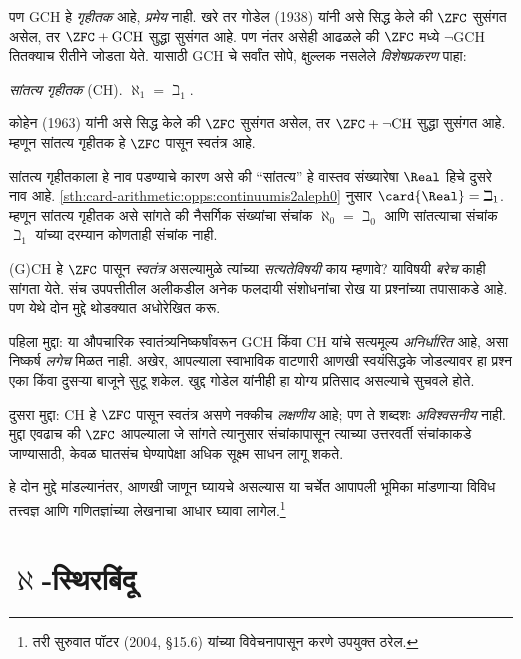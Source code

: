 पण GCH हे \emph{गृहीतक} आहे, \emph{प्रमेय} नाही. खरे तर गोडेल (1938) यांनी असे सिद्ध केले की $\ZFC$ सुसंगत असेल, तर $\ZFC + \text{GCH}$ सुद्धा सुसंगत आहे. पण नंतर असेही आढळले की $\ZFC$ मध्ये $\lnot$GCH तितक्याच रीतीने जोडता येते. यासाठी GCH चे सर्वांत सोपे, क्षुल्लक नसलेले \emph{विशेषप्रकरण} पाहा:

\begin{defish}
\emph{सांतत्य गृहीतक} (CH). $\aleph_1 = \beth_1$.
\end{defish}

कोहेन (1963) यांनी असे सिद्ध केले की $\ZFC$ सुसंगत असेल, तर $\ZFC
+ \lnot\text{CH}$ सुद्धा सुसंगत आहे. म्हणून सांतत्य गृहीतक हे $\ZFC$ पासून स्वतंत्र आहे.

सांतत्य गृहीतकाला हे नाव पडण्याचे कारण असे की “सांतत्य” हे वास्तव संख्यारेषा $\Real$ हिचे दुसरे नाव आहे. \ref{sth:card-arithmetic:opps:continuumis2aleph0} नुसार $\card{\Real} =
\beth_1$. म्हणून सांतत्य गृहीतक असे सांगते की नैसर्गिक संख्यांचा संचांक $\aleph_0 = \beth_0$ आणि सांतत्याचा संचांक $\beth_1$ यांच्या दरम्यान कोणताही संचांक नाही.

(G)CH हे $\ZFC$ पासून \emph{स्वतंत्र} असल्यामुळे त्यांच्या \emph{सत्यतेविषयी} काय म्हणावे? याविषयी \emph{बरेच} काही सांगता येते. संच उपपत्तीतील अलीकडील अनेक फलदायी संशोधनांचा रोख या प्रश्नांच्या तपासाकडे आहे. पण येथे दोन मुद्दे थोडक्यात अधोरेखित करू.

पहिला मुद्दा: या औपचारिक स्वातंत्र्यनिष्कर्षांवरून GCH किंवा CH यांचे सत्यमूल्य \emph{अनिर्धारित} आहे, असा निष्कर्ष \emph{लगेच} मिळत नाही. अखेर, आपल्याला स्वाभाविक वाटणारी आणखी स्वयंसिद्धके जोडल्यावर हा प्रश्न एका किंवा दुसऱ्या बाजूने सुटू शकेल. खुद्द गोडेल यांनीही हा योग्य प्रतिसाद असल्याचे सुचवले होते.

दुसरा मुद्दा: CH हे $\ZFC$ पासून स्वतंत्र असणे नक्कीच \emph{लक्षणीय} आहे; पण ते शब्दशः \emph{अविश्वसनीय} नाही. मुद्दा एवढाच की $\ZFC$ आपल्याला जे सांगते त्यानुसार संचांकापासून त्याच्या उत्तरवर्ती संचांकाकडे जाण्यासाठी, केवळ घातसंच घेण्यापेक्षा अधिक सूक्ष्म साधन लागू शकते.




हे दोन मुद्दे मांडल्यानंतर, आणखी जाणून घ्यायचे असल्यास या चर्चेत आपापली भूमिका मांडणाऱ्या विविध तत्त्वज्ञ आणि गणितज्ञांच्या लेखनाचा आधार घ्यावा लागेल.\footnote{तरी सुरुवात पॉटर (2004, \S15.6) यांच्या विवेचनापासून करणे उपयुक्त ठरेल.}







\section{$\aleph$-स्थिरबिंदू}\label{sth:card-arithmetic:fix:sec}

